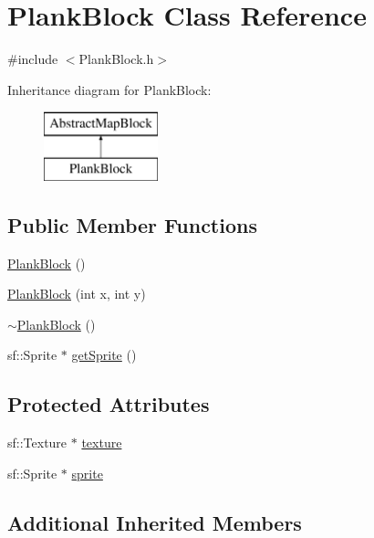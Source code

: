 \hypertarget{class_plank_block}{}\section{Plank\+Block Class Reference}
\label{class_plank_block}


{\ttfamily \#include $<$Plank\+Block.\+h$>$}

Inheritance diagram for Plank\+Block\+:\begin{figure}[H]
\begin{center}
\leavevmode
\includegraphics[height=2.000000cm]{class_plank_block}
\end{center}
\end{figure}
\subsection*{Public Member Functions}
\begin{DoxyCompactItemize}
\item 
\hyperlink{class_plank_block_af0a7e46056468e24b74c0aca475533b9}{Plank\+Block} ()
\item 
\hyperlink{class_plank_block_afed7c0965c7e1e4b9ec98a4ff06825df}{Plank\+Block} (int x, int y)
\item 
\hyperlink{class_plank_block_afbd822caf201cd34777e46addb7f50c8}{$\sim$\+Plank\+Block} ()
\item 
sf\+::\+Sprite $\ast$ \hyperlink{class_plank_block_abada589bb200fd82fcfe00482ad6a32f}{get\+Sprite} ()
\end{DoxyCompactItemize}
\subsection*{Protected Attributes}
\begin{DoxyCompactItemize}
\item 
sf\+::\+Texture $\ast$ \hyperlink{class_plank_block_a9b6bada075fecb031e3db24eff50fd19}{texture}
\item 
sf\+::\+Sprite $\ast$ \hyperlink{class_plank_block_a28e42e2ccc8973b39b3c1fbdeee78c36}{sprite}
\end{DoxyCompactItemize}
\subsection*{Additional Inherited Members}


